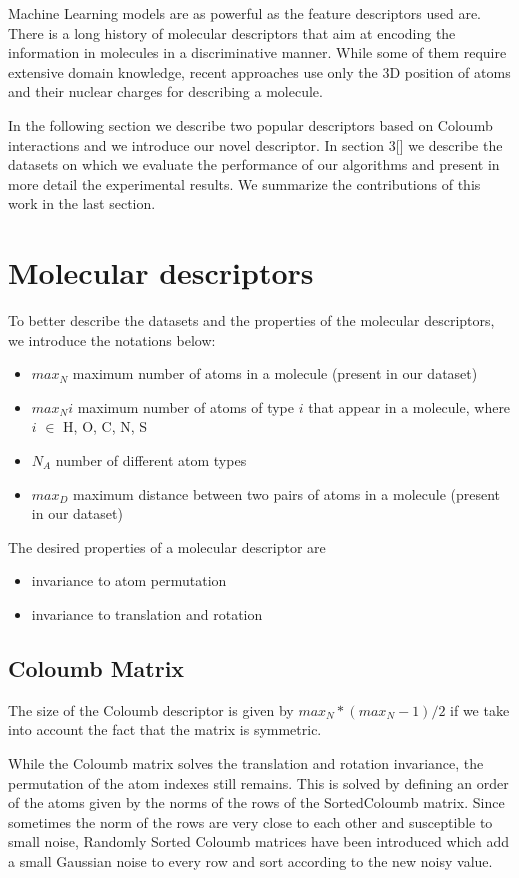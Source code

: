 \documentclass{article}
\begin{document}
Machine Learning models are as powerful as the feature descriptors used are. There is a long history of molecular descriptors \cite{todeschini2000handbook} that aim at encoding the information in molecules in a discriminative manner. While some of them require extensive domain knowledge, recent approaches \cite{initialcoloumb} use only the 3D position of atoms and their nuclear charges for describing a molecule.

In the following section we describe two popular descriptors based on Coloumb interactions and we introduce our novel descriptor. In section 3[] we describe the datasets on which we evaluate the performance of our algorithms and present in more detail the experimental results. We summarize the contributions of this work in the last section.

\section{Molecular descriptors}

To better describe the datasets and the properties of the molecular descriptors, we introduce the notations below:
\begin{itemize}
\item $max_N$ maximum number of atoms in a molecule (present in our dataset)
\item $max_Ni$ maximum number of atoms of type $i$ that appear in a molecule, where $i$ $\in$ {H, O, C, N, S}
\item $N_A$ number of different atom types
\item $max_D$ maximum distance between two pairs of atoms in a molecule (present in our dataset)
\end{itemize}
The desired properties of a molecular descriptor are
\begin{itemize}
 \item invariance to atom permutation
 \item invariance to translation and rotation
\end{itemize}

\subsection{Coloumb Matrix}
The size of the Coloumb descriptor is given by $max_N*(max_N - 1)/2$ if we take into account the fact that the matrix is symmetric.

While the Coloumb matrix solves the translation and rotation invariance, the permutation of the atom indexes still remains. This is solved by defining an order of the atoms given by the norms of the rows of the SortedColoumb matrix.
Since sometimes the norm of the rows are very close to each other and susceptible to small noise, Randomly Sorted Coloumb matrices have been introduced which
add a small Gaussian noise to every row and sort according to the new noisy value.
\end{document}
